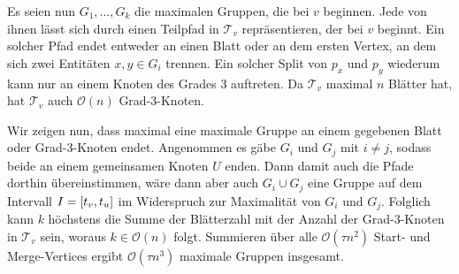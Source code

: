 \begin{beweis}
	Es seien nun $G_1, \ldots ,G_k$ die maximalen Gruppen, die bei $v$ beginnen.
	Jede von ihnen lässt sich durch einen Teilpfad in $\mathcal{T}_v$ repräsentieren, der bei $v$ beginnt.
	Ein solcher Pfad endet entweder an einen Blatt oder an dem ersten Vertex, an dem sich zwei Entitäten $x,y \in G_i$ trennen.
	Ein solcher Split von $p_x$ und $p_y$ wiederum kann nur an einem Knoten des Grades 3 auftreten.
	Da $\mathcal{T}_v$ maximal $n$ Blätter hat, hat $\mathcal{T}_v$ auch $\mathcal{O}(n)$ Grad-3-Knoten.
	
	Wir zeigen nun, dass maximal eine maximale Gruppe an einem gegebenen Blatt oder Grad-3-Knoten endet.
	Angenommen es gäbe $G_i$ und $G_j$ mit $i \neq j$, sodass beide an einem gemeinsamen Knoten $U$ enden.
	Dann damit auch die Pfade dorthin übereinstimmen, wäre dann aber auch $G_i \cup G_j$ eine Gruppe auf dem Intervall $I=\benbrace*{t_v,t_u}$ im Widerspruch zur Maximalität von $G_i$ und $G_j$.
	Folglich kann $k$ höchstens die Summe der Blätterzahl mit der Anzahl der Grad-3-Knoten in $\mathcal{T}_v$ sein, woraus $k \in \mathcal{O}(n)$ folgt.
	Summieren über alle $\mathcal{O}(\tau n^2)$ Start- und Merge-Vertices ergibt $\mathcal{O}(\tau n^3)$ maximale Gruppen insgesamt.
\end{beweis}
